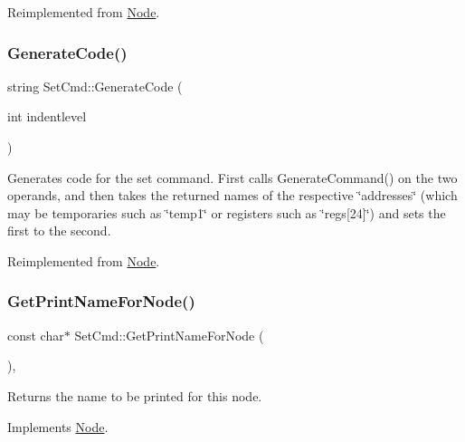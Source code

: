 Reimplemented from \hyperlink{class_node_a5f88d55c6f253a29def7ccc443d83d47}{Node}.

\mbox{\label{class_set_cmd_afa73e8c7e0a5115bdcebd4a6cc3ef1d4}} 
\subsubsection{\texorpdfstring{Generate\+Code()}{GenerateCode()}}
{\footnotesize\ttfamily string Set\+Cmd\+::\+Generate\+Code (\begin{DoxyParamCaption}\item[{int}]{indentlevel }\end{DoxyParamCaption})\hspace{0.3cm}{\ttfamily [virtual]}}

Generates code for the set command. First calls Generate\+Command() on the two operands, and then takes the returned names of the respective \char`\"{}addresses\char`\"{} (which may be temporaries such as \char`\"{}temp1\char`\"{} or registers such as \char`\"{}regs\mbox{[}24\mbox{]}\char`\"{}) and sets the first to the second. 

Reimplemented from \hyperlink{class_node_acb60e526730e8436056375a3055c2c32}{Node}.

\mbox{\label{class_set_cmd_a9a9fc62db9b435358ab4addb1dc4cece}} 
\subsubsection{\texorpdfstring{Get\+Print\+Name\+For\+Node()}{GetPrintNameForNode()}}
{\footnotesize\ttfamily const char$\ast$ Set\+Cmd\+::\+Get\+Print\+Name\+For\+Node (\begin{DoxyParamCaption}{ }\end{DoxyParamCaption})\hspace{0.3cm}{\ttfamily [inline]}, {\ttfamily [virtual]}}

Returns the name to be printed for this node. 

Implements \hyperlink{class_node_a56e29657306ffb004d69c6929ae44269}{Node}.

\mbox{\label{class_set_cmd_ac06d57c11b7c92f3e4b3f94c7a889166}} 
